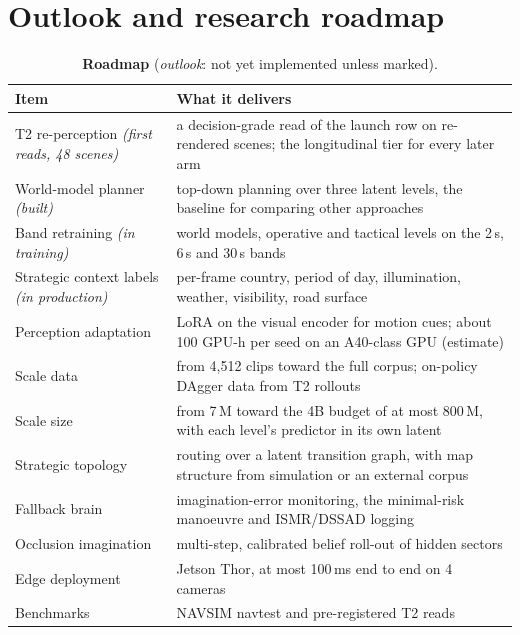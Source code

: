 \documentclass[10pt,twocolumn]{article}
\theoremstyle{remark}
\begin{document}
\section{Outlook and research roadmap}\label{sec:outlook}
\begin{table}[t]
\centering
\caption{\textbf{Roadmap} (\emph{outlook}: not yet implemented unless marked).}
\label{tab:roadmap}
\small
\begin{tabularx}{\columnwidth}{@{}>{\raggedright\arraybackslash}p{24mm}>{\raggedright\arraybackslash}X@{}}
\toprule
Item & What it delivers \\
\midrule
T2 re-perception \textit{(first reads, 48 scenes)} & a decision-grade read of the launch row on re-rendered scenes; the longitudinal tier for every later arm \\
World-model planner \textit{(built)} & top-down planning over three latent levels, the baseline for comparing other approaches \\
Band retraining \textit{(in training)} & world models, operative and tactical levels on the 2\,s, 6\,s and 30\,s bands \\
Strategic context labels \textit{(in production)} & per-frame country, period of day, illumination, weather, visibility, road surface \\
Perception adaptation & LoRA on the visual encoder for motion cues; about 100 GPU-h per seed on an A40-class GPU (estimate) \\
Scale data & from 4,512 clips toward the full corpus; on-policy DAgger data from T2 rollouts \\
Scale size & from 7\,M toward the 4B budget of at most 800\,M, with each level's predictor in its own latent \\
Strategic topology & routing over a latent transition graph, with map structure from simulation or an external corpus \\
Fallback brain & imagination-error monitoring, the minimal-risk manoeuvre and ISMR/DSSAD logging \\
Occlusion imagination & multi-step, calibrated belief roll-out of hidden sectors \\
Edge deployment & Jetson Thor, at most 100\,ms end to end on 4 cameras \\
Benchmarks & NAVSIM navtest and pre-registered T2 reads \\
\bottomrule
\end{tabularx}
\end{table}
\end{document}
